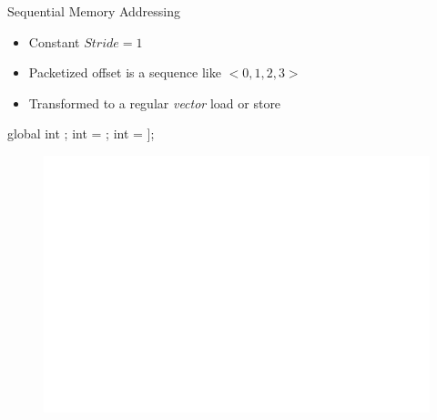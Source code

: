 \begin{frame}[fragile]{Sequential Memory Addressing}

\begin{itemize}
    \item Constant $Stride = 1$
    \item Packetized offset is a sequence like $<0, 1, 2, 3>$
    \item Transformed to a regular \emph{vector} load or store
\end{itemize}

\begin{minipage}[t]{0.40\linewidth}
    \vspace{0.1ex}
    \begin{codebox}[commandchars=\\\[\]]

global int \uniform[*src];
int \varying[tid] = ;
int \varying[x] = \uniform[src]\idx[\varying[tid]];





    \end{codebox}
\end{minipage}
\hspace{1em}
\begin{minipage}[t]{0.49\linewidth}
    \begin{figure}
        \includegraphics[scale=0.5]{images/sequential-access.pdf}
    \end{figure}
\end{minipage}

\end{frame}


